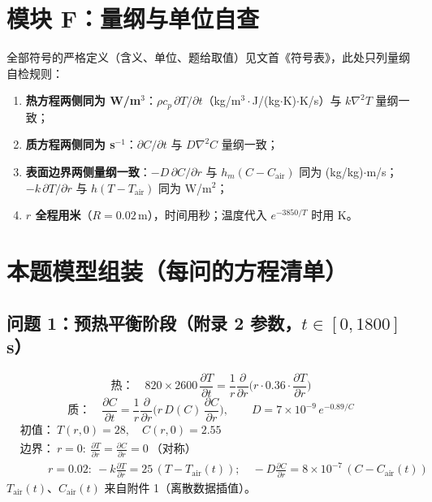 \documentclass[12pt,a4paper]{ctexart}
\begin{document}
\section{模块 F：量纲与单位自查}

全部符号的严格定义（含义、单位、题给取值）见文首《符号表》，此处只列量纲自检规则：

\begin{enumerate}[leftmargin=2.5em]
\item \textbf{热方程两侧同为 W/m$^3$}：$\rho c_p\,\partial T/\partial t$（kg/m$^3\cdot$J/(kg$\cdot$K)$\cdot$K/s）与 $k\nabla^2T$ 量纲一致；
\item \textbf{质方程两侧同为 s$^{-1}$}：$\partial C/\partial t$ 与 $D\nabla^2C$ 量纲一致；
\item \textbf{表面边界两侧量纲一致}：$-D\,\partial C/\partial r$ 与 $h_m(C-C_{\mathrm{air}})$ 同为 (kg/kg)$\cdot$m/s；$-k\,\partial T/\partial r$ 与 $h(T-T_{\mathrm{air}})$ 同为 W/m$^2$；
\item \textbf{$r$ 全程用米}（$R=0.02$\,m），时间用秒；温度代入 $e^{-3850/T}$ 时用 K。
\end{enumerate}

\section{本题模型组装（每问的方程清单）}

\subsection{问题 1：预热平衡阶段（附录 2 参数，$t\in[0,1800]$\,s）}
\begin{equation}
\text{热：}\quad 820\times2600\,\frac{\partial T}{\partial t}=\frac{1}{r}\frac{\partial}{\partial r}\Big(r\cdot0.36\cdot\frac{\partial T}{\partial r}\Big)
\end{equation}
\begin{equation}
\text{质：}\quad \frac{\partial C}{\partial t}=\frac{1}{r}\frac{\partial}{\partial r}\Big(r\,D(C)\,\frac{\partial C}{\partial r}\Big),\qquad D=7\times10^{-9}\,e^{-0.89/C}
\end{equation}
\begin{align*}
&\text{初值：}\ T(r,0)=28,\quad C(r,0)=2.55\\
&\text{边界：}\ r=0:\ \frac{\partial T}{\partial r}=\frac{\partial C}{\partial r}=0\ \text{（对称）}\\
&\qquad\ \ r=0.02:\ -k\frac{\partial T}{\partial r}=25\,(T-T_{\mathrm{air}}(t));\quad
-D\frac{\partial C}{\partial r}=8\times10^{-7}\,(C-C_{\mathrm{air}}(t))
\end{align*}
$T_{\mathrm{air}}(t)$、$C_{\mathrm{air}}(t)$ 来自附件 1（离散数据插值）。
\end{document}
